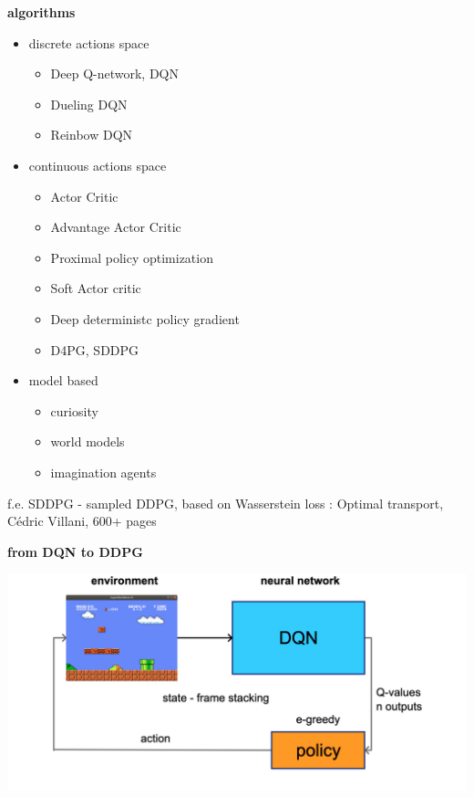 \documentclass[xcolor=dvipsnames]{beamer}
\begin{document}
\begin{frame}{\bf algorithms}
   \begin{itemize}
    \item discrete actions space

        \begin{itemize}
          \item Deep Q-network, DQN
          \item Dueling DQN
          \item Reinbow DQN
        \end{itemize}

    \item continuous actions space
    
        \begin{itemize}
          \item Actor Critic
          \item Advantage Actor Critic
          \item Proximal policy optimization
          \item Soft Actor critic
          \item Deep deterministc policy gradient
          \item D4PG, SDDPG
        \end{itemize}

    \item model based
    
        \begin{itemize}
          \item curiosity
          \item world models
          \item imagination agents
        \end{itemize}

  \end{itemize}

  f.e. SDDPG - sampled DDPG, based on Wasserstein loss : Optimal transport, Cédric Villani, 600+ pages

\end{frame}


\begin{frame}{\bf from DQN to DDPG}

  {\centering \includegraphics[scale=0.2]{../diagrams/dqn.png}}
\end{frame}
\end{document}
